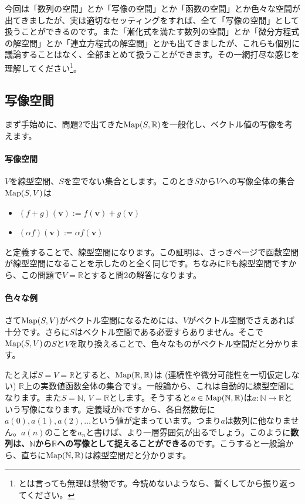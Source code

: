 今回は「数列の空間」とか「写像の空間」とか「函数の空間」とか色々な空間が出てきましたが、実は適切なセッティングをすれば、全て「写像の空間」として扱うことができるのです。また「漸化式を満たす数列の空間」とか「微分方程式の解空間」とか「連立方程式の解空間」とかも出てきましたが、これらも個別に議論することはなく、全部まとめて扱うことができます。その一網打尽な感じを理解してください\footnote{とは言っても無理は禁物です。今読めないようなら、暫くしてから振り返ってください。}。

\subsection{写像空間}

まず手始めに、問題$2$で出てきた$\operatorname{Map}(S,\mathbb{R})$を一般化し、ベクトル値の写像を考えます。

\paragraph{写像空間} $V$を線型空間、$S$を空でない集合とします。このとき$S$から$V$への写像全体の集合$\operatorname{Map}(S, V)$は
\begin{itemize}
\item $(f + g)(\bm{v}) := f(\bm{v}) + g(\bm{v})$
\item $(\alpha f)(\bm{v}) := \alpha f(\bm{v})$
\end{itemize}
と定義することで、線型空間になります。この証明は、さっき\pageref{paragraph:funct_space}ページで函数空間が線型空間になることを示したのと全く同じです。ちなみに$\mathbb{R}$も線型空間ですから、この問題で$V = \mathbb{R}$とすると問2の解答になります。

\paragraph{色々な例}
さて$\operatorname{Map}(S, V)$がベクトル空間になるためには、$V$がベクトル空間でさえあれば十分です。さらに$S$はベクトル空間である必要すらありません。そこで$\operatorname{Map}(S, V)$の$S$と$V$を取り換えることで、色々なものがベクトル空間だと分かります。

たとえば$S = V = \mathbb{R}$とすると、$\operatorname{Map}(\mathbb{R}, \mathbb{R})$は (連続性や微分可能性を一切仮定しない) $\mathbb{R}$上の実数値函数全体の集合です。一般論から、これは自動的に線型空間になります。また$S = \mathbb{N}$, $V = \mathbb{R}$とします。そうすると$a \in \operatorname{Map}(\mathbb{N}, \mathbb{R})$は$a\colon \mathbb{N}\rightarrow\mathbb{R}$という写像になります。定義域が$\mathbb{N}$ですから、各自然数毎に$a(0), a(1), a(2), \ldots$という値が定まっています。つまり$a$は数列に他なりません。$a(n)$のことを$a_n$と書けば、より一層雰囲気が出るでしょう。このように\textbf{数列は、$\mathbb{N}$から$\mathbb{R}$への写像として捉えることができる}のです。こうすると一般論から、直ちに$\operatorname{Map}(\mathbb{N}, \mathbb{R})$は線型空間だと分かります。

